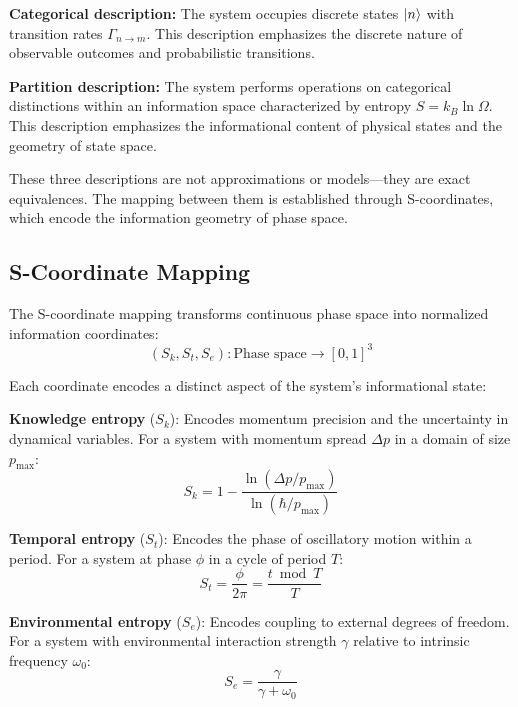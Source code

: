 \documentclass[twocolumn,superscriptaddress,prb,10pt]{revtex4-2}
\begin{document}
\textbf{Categorical description:} The system occupies discrete states $\ket{n}$ with transition rates $\Gamma_{n \to m}$. This description emphasizes the discrete nature of observable outcomes and probabilistic transitions.

\textbf{Partition description:} The system performs operations on categorical distinctions within an information space characterized by entropy $S = k_B \ln \Omega$. This description emphasizes the informational content of physical states and the geometry of state space.

These three descriptions are not approximations or models—they are exact equivalences. The mapping between them is established through S-coordinates, which encode the information geometry of phase space.

\subsection{S-Coordinate Mapping}

The S-coordinate mapping transforms continuous phase space into normalized information coordinates:
\begin{equation}
(S_k, S_t, S_e) : \text{Phase space} \to [0,1]^3
\label{eq:scoord}
\end{equation}

Each coordinate encodes a distinct aspect of the system's informational state:

\textbf{Knowledge entropy} ($S_k$): Encodes momentum precision and the uncertainty in dynamical variables. For a system with momentum spread $\Delta p$ in a domain of size $p_{\max}$:
\begin{equation}
S_k = 1 - \frac{\ln(\Delta p / p_{\max})}{\ln(\hbar / p_{\max})}
\label{eq:sk}
\end{equation}

\textbf{Temporal entropy} ($S_t$): Encodes the phase of oscillatory motion within a period. For a system at phase $\phi$ in a cycle of period $T$:
\begin{equation}
S_t = \frac{\phi}{2\pi} = \frac{t \bmod T}{T}
\label{eq:st}
\end{equation}

\textbf{Environmental entropy} ($S_e$): Encodes coupling to external degrees of freedom. For a system with environmental interaction strength $\gamma$ relative to intrinsic frequency $\omega_0$:
\begin{equation}
S_e = \frac{\gamma}{\gamma + \omega_0}
\label{eq:se}
\end{equation}
\end{document}
